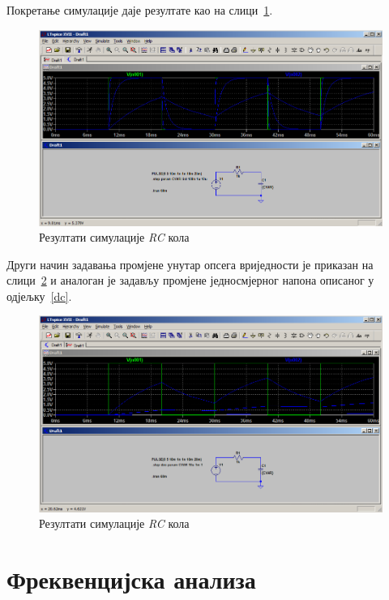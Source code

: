 Покретање симулације даје резултате као на слици~\ref{Fig:rc-step4}.

\begin{figure}[h]
\centering
\includegraphics[width=\figwidth\textwidth]{figs/rc-step4.PNG}
\caption{Резултати симулације \textit{RC} кола}
\label{Fig:rc-step4}
\end{figure}

Други начин задавања промјене унутар опсега вриједности је приказан на слици~\ref{Fig:rc-step5} и аналоган је задављу промјене једносмјерног напона описаног у одјељку~\ref{dc}.

\begin{figure}[h]
\centering
\includegraphics[width=\figwidth\textwidth]{figs/rc-step5.PNG}
\caption{Резултати симулације \textit{RC} кола}
\label{Fig:rc-step5}
\end{figure}

\section{Фреквенцијска анализа}

